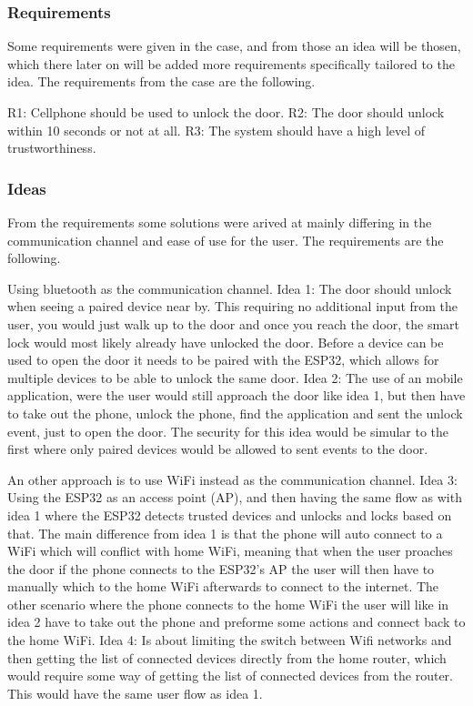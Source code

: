 \subsubsection{Requirements}
Some requirements were given in the case, and from those an idea will be thosen, which there later on will be added more requirements specifically tailored to the idea. The requirements from the case are the following.

R1: Cellphone should be used to unlock the door.
R2: The door should unlock within 10 seconds or not at all.
R3: The system should have a high level of trustworthiness.

\subsubsection{Ideas}
From the requirements some solutions were arived at mainly differing in the communication channel and ease of use for the user. The requirements are the following.

Using bluetooth as the communication channel. Idea 1: The door should unlock when seeing a paired device near by. This requiring no additional input from the user, you would just walk up to the door and once you reach the door, the smart lock would most likely already have unlocked the door. Before a device can be used to open the door it needs to be paired with the ESP32, which allows for multiple devices to be able to unlock the same door. Idea 2: The use of an mobile application, were the user would still approach the door like idea 1, but then have to take out the phone, unlock the phone, find the application and sent the unlock event, just to open the door. The security for this idea would be simular to the first where only paired devices would be allowed to sent events to the door.

An other approach is to use WiFi instead as the communication channel. Idea 3: Using the ESP32 as an access point (AP), and then having the same flow as with idea 1 where the ESP32 detects trusted devices and unlocks and locks based on that. The main difference from idea 1 is that the phone will auto connect to a WiFi which will conflict with home WiFi, meaning that when the user proaches the door if the phone connects to the ESP32's AP the user will then have to manually which to the home WiFi afterwards to connect to the internet. The other scenario where the phone connects to the home WiFi the user will like in idea 2 have to take out the phone and preforme some actions and connect back to the home WiFi. Idea 4: Is about limiting the switch between Wifi networks and then getting the list of connected devices directly from the home router, which would require some way of getting the list of connected devices from the router. This would have the same user flow as idea 1.

